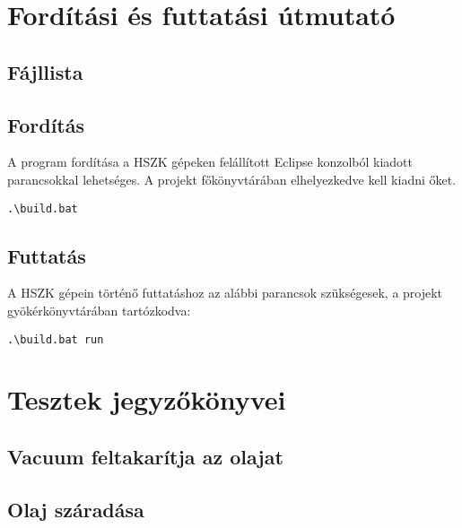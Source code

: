 \section{Fordítási és futtatási útmutató}

\subsection{Fájllista}


\subsection{Fordítás}
A program fordítása a HSZK gépeken felállított Eclipse konzolból kiadott parancsokkal lehetséges.
A projekt főkönyvtárában elhelyezkedve kell kiadni őket.

\lstset{escapeinside=`', xleftmargin=10pt, frame=single, basicstyle=\ttfamily\footnotesize, language=sh}
\begin{lstlisting}
.\build.bat
\end{lstlisting}

\subsection{Futtatás}
A HSZK gépein történő futtatáshoz az alábbi parancsok szükségesek, a projekt gyökérkönyvtárában tartózkodva:

\lstset{escapeinside=`', xleftmargin=10pt, frame=single, basicstyle=\ttfamily\footnotesize, language=sh}
\begin{lstlisting}
.\build.bat run
\end{lstlisting}

\section{Tesztek jegyzőkönyvei}

\subsection{Vacuum feltakarítja az olajat}

\subsection{Olaj száradása}

